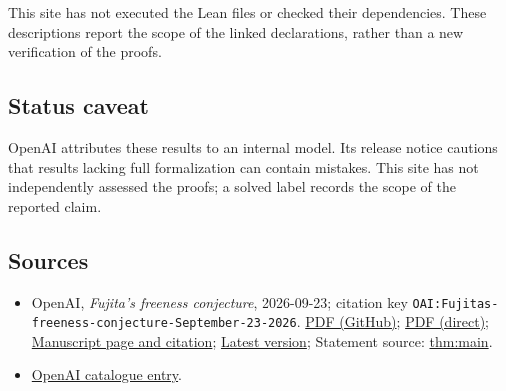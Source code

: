 \documentclass[11pt]{article}
\begin{document}
This site has not executed the Lean files or checked their dependencies. These descriptions report the scope of the linked declarations, rather than a new verification of the proofs.

\subsection{Status caveat}
OpenAI attributes these results to an internal model. Its release notice cautions that results lacking full formalization can contain mistakes. This site has not independently assessed the proofs; a solved label records the scope of the reported claim.

\subsection{Sources}
\begin{itemize}
\item OpenAI, \emph{Fujita's freeness conjecture}, 2026-09-23; citation key \texttt{OAI:Fujitas-freeness-conjecture-September-23-2026}. \href{https://github.com/openai/math/blob/adc7f1241b42e322a6451854ab7e4b4c146bf78a/preprints/Fujitas-freeness-conjecture-September-23-2026/Fujitas-freeness-conjecture-September-23-2026.pdf}{PDF (GitHub)}; \href{https://github.com/openai/math/raw/adc7f1241b42e322a6451854ab7e4b4c146bf78a/preprints/Fujitas-freeness-conjecture-September-23-2026/Fujitas-freeness-conjecture-September-23-2026.pdf}{PDF (direct)}; \href{https://github.com/openai/math/blob/adc7f1241b42e322a6451854ab7e4b4c146bf78a/preprints/Fujitas-freeness-conjecture-September-23-2026/README.md}{Manuscript page and citation}; \href{https://github.com/openai/math/blob/main/preprints/Fujitas-freeness-conjecture-September-23-2026/Fujitas-freeness-conjecture-September-23-2026.pdf}{Latest version}; Statement source: \href{https://github.com/openai/math/blob/adc7f1241b42e322a6451854ab7e4b4c146bf78a/preprints/Fujitas-freeness-conjecture-September-23-2026/build/main.tex\#L70}{thm:main}.
\item \href{https://github.com/openai/math/blob/adc7f1241b42e322a6451854ab7e4b4c146bf78a/CONTENTS.md}{OpenAI catalogue entry}.
\end{itemize}
\end{document}
